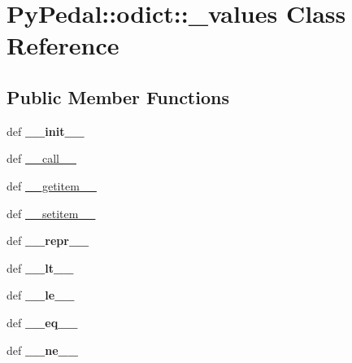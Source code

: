\hypertarget{classPyPedal_1_1odict_1_1__values}{
\section{PyPedal::odict::\_\-values Class Reference}
\label{classPyPedal_1_1odict_1_1__values}
}
\subsection*{Public Member Functions}
\begin{CompactItemize}
\item 
\hypertarget{classPyPedal_1_1odict_1_1__values_6ea2791ab70c483754836b536476a708}{
def \textbf{\_\-\_\-init\_\-\_\-}}
\label{classPyPedal_1_1odict_1_1__values_6ea2791ab70c483754836b536476a708}

\item 
def \hyperlink{classPyPedal_1_1odict_1_1__values_eeb381aa8f439bf3f062490ffb57abdf}{\_\-\_\-call\_\-\_\-}
\item 
def \hyperlink{classPyPedal_1_1odict_1_1__values_a8d80e1fb2e909bacb2f44d478919d13}{\_\-\_\-getitem\_\-\_\-}
\item 
def \hyperlink{classPyPedal_1_1odict_1_1__values_ffbc3fb75642a48ccb12341abcac5755}{\_\-\_\-setitem\_\-\_\-}
\item 
\hypertarget{classPyPedal_1_1odict_1_1__values_778692f0f01d0c18c2894aa6995ab3e9}{
def \textbf{\_\-\_\-repr\_\-\_\-}}
\label{classPyPedal_1_1odict_1_1__values_778692f0f01d0c18c2894aa6995ab3e9}

\item 
\hypertarget{classPyPedal_1_1odict_1_1__values_cf4f8a5753ca1844fb409bf966a40504}{
def \textbf{\_\-\_\-lt\_\-\_\-}}
\label{classPyPedal_1_1odict_1_1__values_cf4f8a5753ca1844fb409bf966a40504}

\item 
\hypertarget{classPyPedal_1_1odict_1_1__values_6cd76d8a62e53ca2c11f79860052e6ff}{
def \textbf{\_\-\_\-le\_\-\_\-}}
\label{classPyPedal_1_1odict_1_1__values_6cd76d8a62e53ca2c11f79860052e6ff}

\item 
\hypertarget{classPyPedal_1_1odict_1_1__values_70b0a09561933ae510ed11def5a217d9}{
def \textbf{\_\-\_\-eq\_\-\_\-}}
\label{classPyPedal_1_1odict_1_1__values_70b0a09561933ae510ed11def5a217d9}

\item 
\hypertarget{classPyPedal_1_1odict_1_1__values_8789c871f990f8e04d1d7564e59d01b0}{
def \textbf{\_\-\_\-ne\_\-\_\-}}
\label{classPyPedal_1_1odict_1_1__values_8789c871f990f8e04d1d7564e59d01b0}


\end{CompactItemize}
